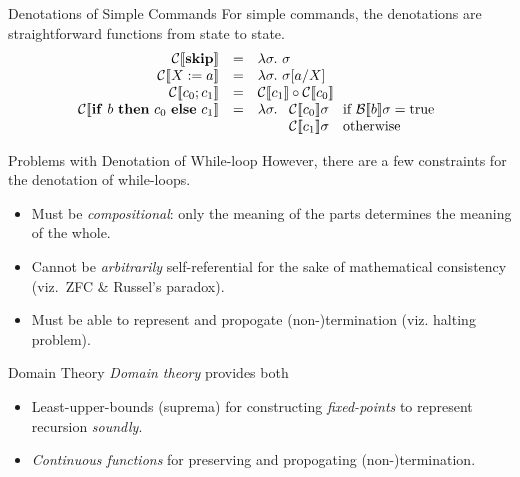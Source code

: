 \begin{frame}{Denotations of Simple Commands}
    For simple commands, the denotations are straightforward functions from state to state.
    \[\begin{array}{rcl}
        \denC{\mathbf{skip}} & = & \lambda \sigma.\ \sigma \\
        \denC{X := a} & = & \lambda \sigma.\ \sigma[a/X] \\
        \denC{c_0; c_1} & = & \denC{c_1} \circ \denC{c_0} \\
        \denC{\mathbf{if}\ b\ \mathbf{then}\ c_0\ \mathbf{else}\ c_1} & = &
            \lambda \sigma.\ \begin{array}[t]{ll}
                \denC{c_0}\sigma & \text{if } \denB{b}\sigma = \mathrm{true} \\
                \denC{c_1}\sigma & \text{otherwise}
            \end{array}
    \end{array}\]
\end{frame}

\begin{frame}{Problems with Denotation of While-loop}
    However, there are a few constraints for the denotation of while-loops.
    \pause
    \begin{itemize}[<+->]
        \item Must be \emph{compositional}: only the meaning of the parts
            determines the meaning of the whole.
        \item Cannot be \emph{arbitrarily} self-referential for the
            sake of mathematical consistency (viz.~ZFC \& Russel's paradox).
        \item Must be able to represent and propogate (non-)termination (viz.
            halting problem).
    \end{itemize}
\end{frame}

\begin{frame}{Domain Theory}
    \emph{Domain theory} provides both
    \pause
    \begin{itemize}[<+->]
        \item Least-upper-bounds (suprema) for constructing \emph{fixed-points} to represent recursion \emph{soundly}.
        \item \emph{Continuous functions} for preserving and propogating (non-)termination.
    \end{itemize}
\end{frame}

